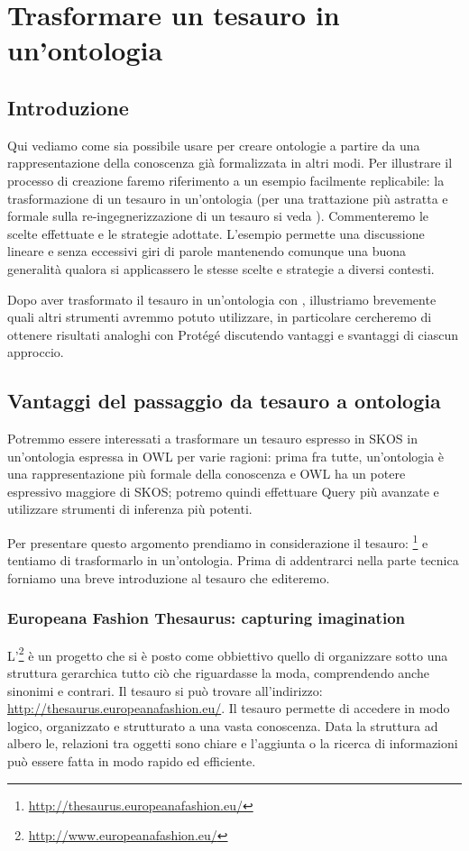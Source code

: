\chapter{Trasformare un tesauro in un'ontologia}\label{ch3}
\section{Introduzione}
Qui vediamo come sia possibile usare \cduce per creare ontologie a partire da una rappresentazione della conoscenza già formalizzata in altri modi. Per illustrare il processo di creazione faremo riferimento a un esempio facilmente replicabile: la trasformazione di un tesauro in un'ontologia (per una trattazione più astratta e formale sulla re-ingegnerizzazione di un tesauro si veda \cite{re_engineeringThesaurus}). Commenteremo le scelte effettuate e le strategie adottate. L'esempio permette una discussione lineare e senza eccessivi giri di parole mantenendo comunque una buona generalità qualora si applicassero le stesse scelte e strategie a diversi contesti.

Dopo aver trasformato il tesauro in un'ontologia con \cduce, illustriamo brevemente quali altri strumenti avremmo potuto utilizzare, in particolare cercheremo di ottenere risultati analoghi con Protégé discutendo vantaggi e svantaggi di ciascun approccio.

\section{Vantaggi del passaggio da tesauro a ontologia}
Potremmo essere interessati a trasformare un tesauro espresso in SKOS in un'ontologia espressa in OWL per varie ragioni: prima fra tutte, un'ontologia è una rappresentazione più formale della conoscenza e OWL ha un potere espressivo maggiore di SKOS; potremo quindi effettuare Query più avanzate e utilizzare strumenti di inferenza più potenti.

Per presentare questo argomento prendiamo in considerazione il tesauro: \footnote{\url{http://thesaurus.europeanafashion.eu/}} e tentiamo di trasformarlo in un'ontologia. Prima di addentrarci nella parte tecnica forniamo una breve introduzione al tesauro che editeremo.
\subsection{Europeana Fashion Thesaurus: capturing imagination}
L'\footnote{\url{http://www.europeanafashion.eu/}} è un progetto che si è posto come obbiettivo quello di organizzare sotto una struttura gerarchica tutto ciò che riguardasse la moda, comprendendo anche sinonimi e contrari. Il tesauro si può trovare all'indirizzo: \url{http://thesaurus.europeanafashion.eu/}. Il tesauro permette di accedere in modo logico, organizzato e strutturato a una vasta conoscenza. Data la struttura ad albero le, relazioni tra oggetti sono chiare e l'aggiunta o la ricerca di informazioni può essere fatta in modo rapido ed efficiente.

